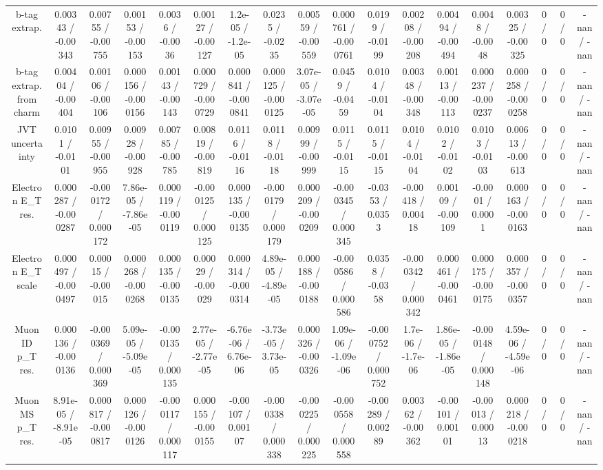 \documentclass[10pt]{article}
\begin{document}
\begin{table}[htbp]
\begin{center}
\begin{tabular}{|c|c|c|c|c|c|c|c|c|c|c|c|c|c|c|c|c|c|}
  b-tag extrap. & 0.00343 / -0.00343 & 0.00755 / -0.00755 & 0.00153 / -0.00153 & 0.0036 / -0.0036 & 0.00127 / -0.00127 & 1.2e-05 / -1.2e-05 & 0.0235 / -0.0235 & 0.00559 / -0.00559 & 0.000761 / -0.000761 & 0.0199 / -0.0199 & 0.00208 / -0.00208 & 0.00494 / -0.00494 & 0.0048 / -0.0048 & 0.00325 / -0.00325 & 0 / 0 & 0 / 0 & -nan / -nan \\ 
  b-tag extrap. from charm & 0.00404 / -0.00404 & 0.00106 / -0.00106 & 0.000156 / -0.000156 & 0.00143 / -0.00143 & 0.000729 / -0.000729 & 0.000841 / -0.000841 & 0.000125 / -0.000125 & 3.07e-05 / -3.07e-05 & 0.0459 / -0.0459 & 0.0104 / -0.0104 & 0.00348 / -0.00348 & 0.00113 / -0.00113 & 0.000237 / -0.000237 & 0.000258 / -0.000258 & 0 / 0 & 0 / 0 & -nan / -nan \\ 
  JVT uncertainty & 0.0101 / -0.0101 & 0.00955 / -0.00955 & 0.00928 / -0.00928 & 0.00785 / -0.00785 & 0.00819 / -0.00819 & 0.0116 / -0.0116 & 0.0118 / -0.0118 & 0.00999 / -0.00999 & 0.0115 / -0.0115 & 0.0115 / -0.0115 & 0.0104 / -0.0104 & 0.0102 / -0.0102 & 0.0103 / -0.0103 & 0.00613 / -0.00613 & 0 / 0 & 0 / 0 & -nan / -nan \\ 
  Electron E_{T} res. & 0.000287 / -0.000287 & -0.000172 / 0.000172 & 7.86e-05 / -7.86e-05 & 0.000119 / -0.000119 & -0.000125 / 0.000125 & 0.000135 / -0.000135 & -0.000179 / 0.000179 & 0.000209 / -0.000209 & -0.000345 / 0.000345 & -0.0353 / 0.0353 & -0.00418 / 0.00418 & 0.00109 / -0.00109 & -0.0001 / 0.0001 & 0.000163 / -0.000163 & 0 / 0 & 0 / 0 & -nan / -nan \\ 
  Electron E_{T} scale & 0.000497 / -0.000497 & 0.00015 / -0.00015 & 0.000268 / -0.000268 & 0.000135 / -0.000135 & 0.00029 / -0.00029 & 0.000314 / -0.000314 & 4.89e-05 / -4.89e-05 & 0.000188 / -0.000188 & -0.000586 / 0.000586 & 0.0358 / -0.0358 & -0.000342 / 0.000342 & 0.000461 / -0.000461 & 0.000175 / -0.000175 & 0.000357 / -0.000357 & 0 / 0 & 0 / 0 & -nan / -nan \\ 
  Muon ID p_{T} res. & 0.000136 / -0.000136 & -0.000369 / 0.000369 & 5.09e-05 / -5.09e-05 & -0.000135 / 0.000135 & 2.77e-05 / -2.77e-05 & -6.76e-06 / 6.76e-06 & -3.73e-05 / 3.73e-05 & 0.000326 / -0.000326 & 1.09e-06 / -1.09e-06 & -0.000752 / 0.000752 & 1.7e-06 / -1.7e-06 & 1.86e-05 / -1.86e-05 & -0.000148 / 0.000148 & 4.59e-06 / -4.59e-06 & 0 / 0 & 0 / 0 & -nan / -nan \\ 
  Muon MS p_{T} res. & 8.91e-05 / -8.91e-05 & 0.000817 / -0.000817 & 0.000126 / -0.000126 & -0.000117 / 0.000117 & 0.000155 / -0.000155 & -0.00107 / 0.00107 & -0.000338 / 0.000338 & -0.000225 / 0.000225 & -0.000558 / 0.000558 & -0.00289 / 0.00289 & 0.00362 / -0.00362 & -0.00101 / 0.00101 & -0.00013 / 0.00013 & 0.000218 / -0.000218 & 0 / 0 & 0 / 0 & -nan / -nan \\ 

\end{tabular}
\end{center}
\end{table}
\end{document}
